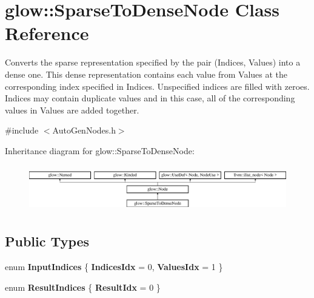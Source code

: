 \hypertarget{classglow_1_1_sparse_to_dense_node}{}\section{glow\+:\+:Sparse\+To\+Dense\+Node Class Reference}
\label{classglow_1_1_sparse_to_dense_node}


Converts the sparse representation specified by the pair (Indices, Values) into a dense one. This dense representation contains each value from Values at the corresponding index specified in Indices. Unspecified indices are filled with zeroes. Indices may contain duplicate values and in this case, all of the corresponding values in Values are added together.  




{\ttfamily \#include $<$Auto\+Gen\+Nodes.\+h$>$}

Inheritance diagram for glow\+:\+:Sparse\+To\+Dense\+Node\+:\begin{figure}[H]
\begin{center}
\leavevmode
\includegraphics[height=2.028986cm]{classglow_1_1_sparse_to_dense_node}
\end{center}
\end{figure}
\subsection*{Public Types}
\begin{DoxyCompactItemize}
\item 
\mbox{\label{classglow_1_1_sparse_to_dense_node_ac275b7928184060613e0e17cae98f953}} 
enum {\bfseries Input\+Indices} \{ {\bfseries Indices\+Idx} = 0, 
{\bfseries Values\+Idx} = 1
 \}
\item 
\mbox{\label{classglow_1_1_sparse_to_dense_node_a2e4c41bf206dd7263d053f28226ace25}} 
enum {\bfseries Result\+Indices} \{ {\bfseries Result\+Idx} = 0
 \}
\end{DoxyCompactItemize}
